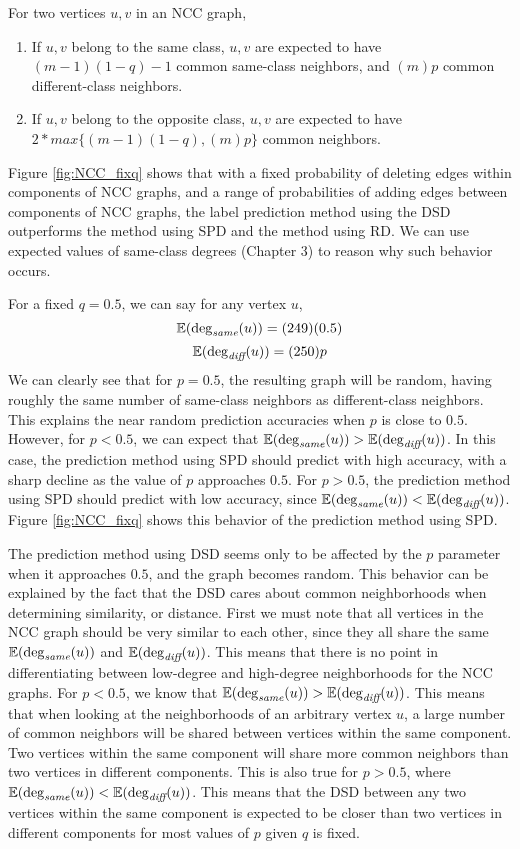 \begin{proposition}
For two vertices $u,v$ in an NCC graph,
\begin{enumerate}[(1)]
\item If $u,v$ belong to the same class, $u,v$ are expected to have
$(m-1)(1-q)-1$ common same-class neighbors, and $(m)p$ common different-class neighbors.

\item If $u,v$ belong to the opposite class, $u,v$ are expected to have
$2*\textit{max}\{(m-1)(1-q), (m)p\}$ common neighbors.
\end{enumerate}
\end{proposition}

Figure \ref{fig:NCC_fixq} shows that with a fixed probability of deleting
edges within components of NCC graphs, and a range of probabilities of
adding edges between components of NCC graphs, the label prediction method
using the DSD outperforms the method using SPD and the method using RD.
We can use expected values of same-class degrees (Chapter 3) to reason why
such behavior occurs.

For a fixed $q=0.5$, we can say for any vertex $u$,
$$\mathbb{E}(\deg_{\textit{same}}(u)) = (249)(0.5)$$
$$\mathbb{E}(\deg_{\textit{diff}}(u)) = (250)p$$
We can clearly see that for $p=0.5$, the resulting graph will be random,
having roughly the same number of same-class neighbors as different-class 
neighbors. This explains the near random prediction accuracies when $p$ is
close to $0.5$. However, for $p < 0.5$, we can expect that
$\mathbb{E}(\deg_{\textit{same}}(u)) > \mathbb{E}(\deg_{\textit{diff}}(u))$.
In this case, the prediction method using SPD should predict with high
accuracy, with a sharp decline as the value of $p$ approaches $0.5$. For 
$p > 0.5$, the prediction method using SPD should predict with low 
accuracy, since $\mathbb{E}(\deg_{\textit{same}}(u)) < \mathbb{E}(\deg_{\textit{diff}}(u))$. Figure
\ref{fig:NCC_fixq} shows this behavior of the prediction method using SPD.

The prediction method using DSD seems only to be affected by the $p$
parameter when it approaches $0.5$, and the graph becomes random. This
behavior can be explained by the fact that the DSD cares about common
neighborhoods when determining similarity, or distance. First we must note
that all vertices in the NCC graph should be very similar to each other,
since they all share the same $\mathbb{E}(\deg_{\textit{same}}(u))$ and
$\mathbb{E}(\deg_{\textit{diff}}(u))$. This means that there is no point in differentiating
between low-degree and high-degree neighborhoods for the NCC graphs.
For $p < 0.5$, we know that $\mathbb{E}(\deg_{\textit{same}}(u)) > \mathbb{E}(\deg_{\textit{diff}}(u))$.
This means that when looking at the neighborhoods of an arbitrary vertex 
$u$, a large number of common neighbors will be shared between vertices
within the same component. Two vertices within the same component will 
share more common neighbors than two vertices in different components. This 
is also true for $p > 0.5$, where 
$\mathbb{E}(\deg_{\textit{same}}(u)) < \mathbb{E}(\deg_{\textit{diff}}(u))$. This means that the DSD
between any two vertices within the same component is expected to be closer
than two vertices in different components for most values of $p$ given $q$ 
is fixed.

